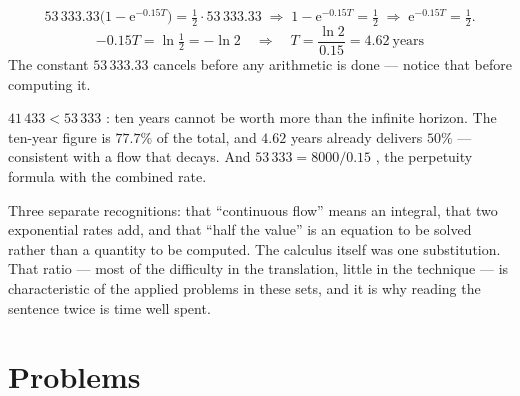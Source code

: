 \begin{worked}
\[
  53\,333.33\bigl(1-\mathrm{e}^{-0.15T}\bigr)=\tfrac12\cdot53\,333.33
  \;\Longrightarrow\;
  1-\mathrm{e}^{-0.15T}=\tfrac12
  \;\Longrightarrow\;
  \mathrm{e}^{-0.15T}=\tfrac12 .
\]
\[
  -0.15T=\ln\tfrac12=-\ln2
  \quad\Longrightarrow\quad
  T=\frac{\ln2}{0.15}=\boxed{4.62\ \text{years}}
\]
The constant $53\,333.33$ cancels before any arithmetic is done --- notice
that before computing it.

$41\,433<53\,333$ \checkmark: ten years cannot be worth more than the infinite horizon. The ten-year
figure is $77.7\%$ of the total, and $4.62$ years already delivers $50\%$
\checkmark --- consistent with a flow that decays. And $53\,333=8000/0.15$
\checkmark, the perpetuity formula with the combined rate.

Three separate recognitions: that ``continuous flow'' means an integral,
that two exponential rates add, and that ``half the value'' is an equation
to be solved rather than a quantity to be computed. The calculus itself was
one substitution. That ratio --- most of the difficulty in the translation,
little in the technique --- is characteristic of the applied problems in
these sets, and it is why reading the sentence twice is time well spent.
\end{worked}

\section{Problems}

